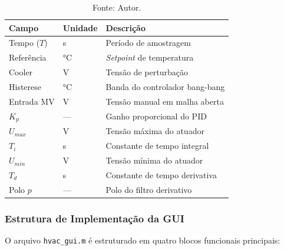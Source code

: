 \documentclass[repeatfields,xlists,xpacks,oneside]{ufrgscca}
\begin{document}
\begin{table}[htbp]
  \caption{Parâmetros configuráveis na interface gráfica.}
  \label{tab:gui_params}
  \centering
  \begin{tabular}{lll}
    \hline
    \textbf{Campo} & \textbf{Unidade} & \textbf{Descrição} \\
    \hline
    Tempo ($T$)  & s    & Período de amostragem \\
    Referência   & °C   & \textit{Setpoint} de temperatura \\
    Cooler       & V    & Tensão de perturbação \\
    Histerese    & °C   & Banda do controlador bang-bang \\
    Entrada MV   & V    & Tensão manual em malha aberta \\
    $K_p$        & ---  & Ganho proporcional do PID \\
    $U_{max}$    & V    & Tensão máxima do atuador \\
    $T_i$        & s    & Constante de tempo integral \\
    $U_{min}$    & V    & Tensão mínima do atuador \\
    $T_d$        & s    & Constante de tempo derivativa \\
    Polo $p$     & ---  & Polo do filtro derivativo \\
    \hline
  \end{tabular}
  \caption*{Fonte: Autor.}
\end{table}

\subsubsection{Estrutura de Implementação da GUI}

O arquivo \texttt{hvac\_gui.m} é estruturado em quatro
blocos funcionais principais:
\end{document}
